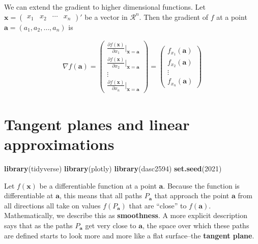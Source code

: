\documentclass[
]{book}
\newenvironment{Shaded}{\begin{snugshade}}{\end{snugshade}}
\newcommand{\DecValTok}[1]{\textcolor[rgb]{0.00,0.00,0.81}{#1}}
\newcommand{\KeywordTok}[1]{\textcolor[rgb]{0.13,0.29,0.53}{\textbf{#1}}}
\newcommand{\NormalTok}[1]{#1}
\theoremstyle{definition}
\theoremstyle{definition}
\theoremstyle{definition}
\theoremstyle{remark}
\begin{document}
We can extend the gradient to higher dimensional functions. Let \(\mathbf{x} = \begin{pmatrix} x_1 & x_2 & \cdots & x_n \end{pmatrix}'\) be a vector in \(\mathcal{R}^n\). Then the gradient of \(f\) at a point \(\mathbf{a} = (a_1, a_2, \ldots, a_n)\) is

\[
\begin{aligned}
 \nabla f(\mathbf{a}) = \begin{pmatrix} \frac{\partial f(\mathbf{x})}{\partial x_1}|_{\mathbf{x} = \mathbf{a}} \\ \frac{\partial f(\mathbf{x})}{\partial x_2}|_{\mathbf{x} = \mathbf{a}} \\  \vdots \\ \frac{\partial f(\mathbf{x})}{\partial x_n}|_{\mathbf{x} = \mathbf{a}} \end{pmatrix} = \begin{pmatrix} f_{x_1}(\mathbf{a}) \\ f_{x_2}(\mathbf{a}) \\  \vdots \\ f_{x_n}(\mathbf{a}) \end{pmatrix} 
\end{aligned}
\]

\hypertarget{tangent-planes-and-linear-approximations}{%
\chapter{Tangent planes and linear approximations}\label{tangent-planes-and-linear-approximations}}

\begin{Shaded}
\begin{Highlighting}[]
\KeywordTok{library}\NormalTok{(tidyverse)}
\KeywordTok{library}\NormalTok{(plotly)}
\KeywordTok{library}\NormalTok{(dasc2594)}
\KeywordTok{set.seed}\NormalTok{(}\DecValTok{2021}\NormalTok{)}
\end{Highlighting}
\end{Shaded}

Let \(f(\mathbf{x})\) be a differentiable function at a point \(\mathbf{a}\). Because the function is differentiable at \(\mathbf{a}\), this means that all paths \(P_\mathbf{a}\) that approach the point \(\mathbf{a}\) from all directions all take on values \(f(P_\mathbf{a})\) that are ``close'' to \(f(\mathbf{a})\). Mathematically, we describe this as \textbf{smoothness}. A more explicit description says that as the paths \(P_{\mathbf{a}}\) get very close to \(\mathbf{a}\), the space over which these paths are defined starts to look more and more like a flat surface--the \textbf{tangent plane}.
\end{document}
